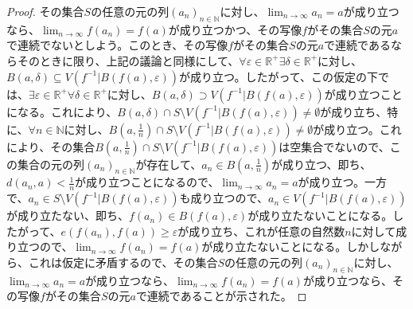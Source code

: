\documentclass[dvipdfmx]{jsarticle}
\begin{document}
\begin{proof}
その集合$S$の任意の元の列$\left( a_{n} \right)_{n \in \mathbb{N}}$に対し、$\lim_{n \rightarrow \infty}a_{n} = a$が成り立つなら、$\lim_{n \rightarrow \infty}{f\left( a_{n} \right)} = f(a)$が成り立つかつ、その写像$f$がその集合$S$の元$a$で連続でないとしよう。このとき、その写像$f$がその集合$S$の元$a$で連続であるならそのときに限り、上記の議論と同様にして、$\forall\varepsilon \in \mathbb{R}^{+}\exists\delta \in \mathbb{R}^{+}$に対し、$B(a,\delta) \subseteq V\left( f^{- 1}|B\left( f(a),\varepsilon \right) \right)$が成り立つ。したがって、この仮定の下では、$\exists\varepsilon \in \mathbb{R}^{+}\forall\delta \in \mathbb{R}^{+}$に対し、$B(a,\delta) \supset V\left( f^{- 1}|B\left( f(a),\varepsilon \right) \right)$が成り立つことになる。これにより、$B(a,\delta) \cap S \setminus V\left( f^{- 1}|B\left( f(a),\varepsilon \right) \right) \neq \emptyset$が成り立ち、特に、$\forall n \in \mathbb{N}$に対し、$B\left( a,\frac{1}{n} \right) \cap S \setminus V\left( f^{- 1}|B\left( f(a),\varepsilon \right) \right) \neq \emptyset$が成り立つ。これにより、その集合$B\left( a,\frac{1}{n} \right) \cap S \setminus V\left( f^{- 1}|B\left( f(a),\varepsilon \right) \right)$は空集合でないので、この集合の元の列$\left( a_{n} \right)_{n \in \mathbb{N}}$が存在して、$a_{n} \in B\left( a,\frac{1}{n} \right)$が成り立つ、即ち、$d\left( a_{n},a \right) < \frac{1}{n}$が成り立つことになるので、$\lim_{n \rightarrow \infty}a_{n} = a$が成り立つ。一方で、$a_{n} \in S \setminus V\left( f^{- 1}|B\left( f(a),\varepsilon \right) \right)$も成り立つので、$a_{n} \in V\left( f^{- 1}|B\left( f(a),\varepsilon \right) \right)$が成り立たない、即ち、$f\left( a_{n} \right) \in B\left( f(a),\varepsilon \right)$が成り立たないことになる。したがって、$e\left( f\left( a_{n} \right),f(a) \right) \geq \varepsilon$が成り立ち、これが任意の自然数$n$に対して成り立つので、$\lim_{n \rightarrow \infty}{f\left( a_{n} \right)} = f(a)$が成り立たないことになる。しかしながら、これは仮定に矛盾するので、その集合$S$の任意の元の列$\left( a_{n} \right)_{n \in \mathbb{N}}$に対し、$\lim_{n \rightarrow \infty}a_{n} = a$が成り立つなら、$\lim_{n \rightarrow \infty}{f\left( a_{n} \right)} = f(a)$が成り立つなら、その写像$f$がその集合$S$の元$a$で連続であることが示された。
\end{proof}
\end{document}
